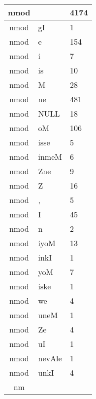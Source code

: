 \documentclass[a4 paper]{article}
\begin{document}
\begin{longtable}{cp{}p{}}
nmod &  & 4174\\ \midrule nmod & gI & 1\\ \midrule nmod & e & 154\\ \midrule nmod & i & 7\\ \midrule nmod & is & 10\\ \midrule nmod & M & 28\\ \midrule nmod & ne & 481\\ \midrule nmod & NULL & 18\\ \midrule nmod & oM & 106\\ \midrule nmod & isse & 5\\ \midrule nmod & inmeM & 6\\ \midrule nmod & Zne & 9\\ \midrule nmod & Z & 16\\ \midrule nmod & , & 5\\ \midrule nmod & I & 45\\ \midrule nmod & n & 2\\ \midrule nmod & iyoM & 13\\ \midrule nmod & inkI & 1\\ \midrule nmod & yoM & 7\\ \midrule nmod & iske & 1\\ \midrule nmod & we & 4\\ \midrule nmod & uneM & 1\\ \midrule nmod & Ze & 4\\ \midrule nmod & uI & 1\\ \midrule nmod & nevAle & 1\\ \midrule nmod & unkI & 4\\ \midrule nm
\end{longtable}
\end{document}
